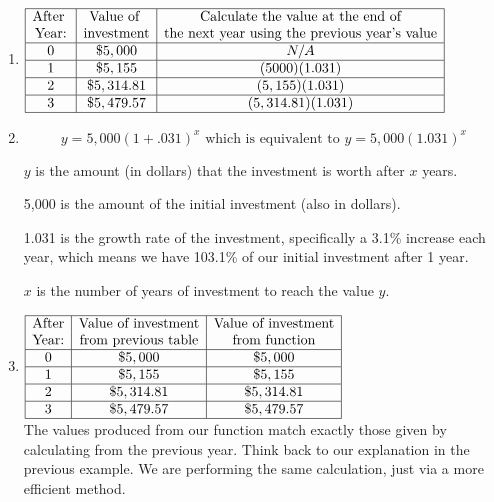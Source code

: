 \documentclass{ximera}
\begin{document}
\begin{explanation}
\begin{enumerate}
\item    $\begin{array}{|c|c|c|}
\hline
\text{After }& \text{Value of } & \text{Calculate the value at the end of} \\
\text{Year:} & \text{investment} & \text{the next year using the previous year's value} \\
\hline
0 & \$5,000 & N/A  \\
\hline
1 & \$5,155 & (5000)(1.031) \\
\hline
2 &	\$5,314.81 & (5,155)(1.031) \\
\hline
3 &	\$5,479.57 & (5,314.81)(1.031)   \\
\hline
\end{array}$

        \item 
		\begin{equation*}
     			y = 5,000(1+.031)^x \text{ which is equivalent to }y = 5,000(1.031)^x
     		 \end{equation*}
		 
		$y$ is the amount (in dollars) that the investment is worth after $x$ years.
		
		5,000 is the amount of the initial investment (also in dollars).
		
		1.031 is the growth rate of the investment, specifically a 3.1\% increase each year, which means we have 103.1\% of our initial investment after 1 year.
		
		$x$ is the number of years of investment to reach the value $y$.

       \item $\begin{array}{|c|c|c|}
\hline
\text{After}& \text{Value of investment} & \text{Value of investment} \\
\text{Year:}& \text{from previous table} & \text{from function} \\
\hline
0 & \$5,000 & \$5,000\\
\hline
1 & \$5,155 &  \$5,155\\
\hline
2 &	\$5,314.81 & \$5,314.81 \\
\hline
3 &	\$5,479.57 & \$5,479.57 \\
\hline
\end{array}$\\
\smallskip
The values produced from our function match exactly those given by calculating from the previous year. Think back to our explanation in the previous example. We are performing the same calculation, just via a more efficient method.


\end{enumerate}
\end{explanation}
\end{document}

